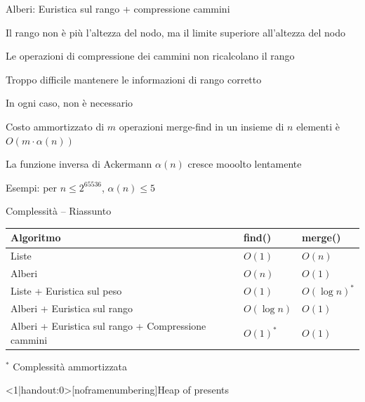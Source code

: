 \begin{frame}{Alberi: Euristica sul rango + compressione cammini}

\BIL
\item Il rango non è più l'altezza del nodo, ma il \alert{limite superiore} all'altezza del nodo
\item Le operazioni di compressione dei cammini \alert{non} ricalcolano il rango
\BI
\item Troppo difficile mantenere le informazioni di rango corretto
\item In ogni caso, non è necessario
\EI
\EIL

\BIL 
\item Costo ammortizzato di $m$ operazioni merge-find in un insieme di $n$
elementi è $O(m \cdot \alpha(n))$
\item  La funzione inversa di Ackermann $\alpha(n)$ cresce mooolto lentamente
\item Esempi: per $n \leq 2^{65536}$, $\alpha(n) \leq 5$
\EIL

\end{frame}

\begin{frame}{Complessità -- Riassunto}

\begin{tabular}{|P{6cm}|l|l|}
\hline
\textbf{Algoritmo} & \textsf{find}() & \textsf{merge}() \\\hline
Liste  & $O(1)$ & $O(n)$ \\\hline
Alberi & $O(n)$ & $O(1)$ \\\hline
Liste + Euristica sul peso & $O(1)$ & $O(\log n)^*$ \\\hline
Alberi + Euristica sul rango & $O(\log n)$ & $O(1)$ \\\hline
Alberi + Euristica sul rango +
Compressione cammini & $O(1)^*$ & $O(1)$ \\\hline
\end{tabular}

\bigskip
$^*$ Complessità ammortizzata

\end{frame}

\begin{frame}<1|handout:0>[noframenumbering]{Heap of presents}


\end{frame}



